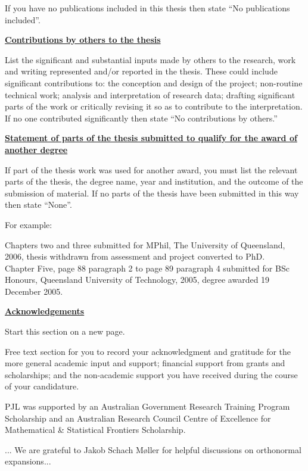 If you have no publications included in this thesis then state ``No
publications included''.

\newpage

{\bf \underline{Contributions by others to the thesis}}

List the significant and substantial inputs made by others to the research,
work and writing represented and/or reported in the thesis. These could include
significant contributions to: the conception and design of the project;
non-routine technical work; analysis and interpretation of research data;
drafting significant parts of the work or critically revising it so as to
contribute to the interpretation. If no one contributed significantly then
state ``No contributions by others.''

{\bf \underline{Statement of parts of the thesis submitted to qualify for
the award of} \\
  \underline{another degree}}

If part of the thesis work was used for another award, you must list the
relevant parts of the thesis, the degree name, year and institution, and the
outcome of the submission of material. If no parts of the thesis have been
submitted in this way then state ``None''.

For example:

Chapters two and three submitted for MPhil, The University of Queensland, 2006,
thesis withdrawn from assessment and project converted to PhD. \\
Chapter Five, page 88 paragraph 2 to page 89 paragraph 4 submitted for BSc
Honours, Queensland University of Technology, 2005, degree awarded 19 December
2005.

\newpage

{\bf \underline{Acknowledgements}}

Start this section on a new page.

Free text section for you to record your acknowledgment and gratitude for the
more general academic input and support; financial support from grants and
scholarships; and the non-academic support you have received during the course
of your candidature.

PJL was supported by an Australian Government Research Training Program Scholarship and an Australian Research Council Centre of Excellence for Mathematical \& Statistical Frontiers Scholarship.

... We are grateful to Jakob Schach M\o ller for helpful discussions on orthonormal expansions...


